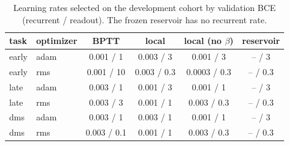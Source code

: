 \begin{table}[h]\centering\small
\caption{Learning rates selected on the development cohort by validation BCE (recurrent / readout). The frozen reservoir has no recurrent rate.}\label{tab:lr}
\begin{tabular}{llcccc}\toprule
task & optimizer & BPTT & local & local (no $\beta$) & reservoir\\ \midrule
early & adam & 0.001 / 1 & 0.003 / 3 & 0.001 / 3 & -- / 3\\
early & rms & 0.001 / 10 & 0.003 / 0.3 & 0.0003 / 0.3 & -- / 0.3\\
late & adam & 0.003 / 1 & 0.001 / 3 & 0.001 / 1 & -- / 3\\
late & rms & 0.003 / 3 & 0.001 / 1 & 0.003 / 0.3 & -- / 0.3\\
dms & adam & 0.003 / 1 & 0.003 / 1 & 0.001 / 1 & -- / 3\\
dms & rms & 0.003 / 0.1 & 0.001 / 1 & 0.003 / 0.3 & -- / 0.3\\
\bottomrule\end{tabular}\end{table}
